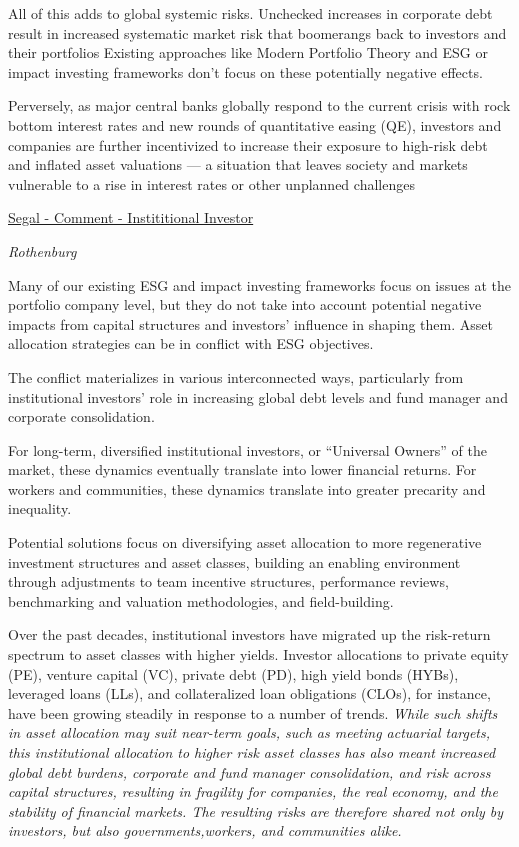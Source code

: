 \documentclass[
]{book}
\begin{document}
All of this adds to global systemic risks.
Unchecked increases in corporate debt result in increased systematic market risk that boomerangs back to investors and their portfolios
Existing approaches like Modern Portfolio Theory and ESG or impact investing frameworks don't focus on these potentially negative effects.

Perversely, as major central banks globally respond to the current crisis with rock bottom interest rates and new rounds of quantitative easing (QE), investors and companies are further incentivized to increase their exposure to high-risk debt and inflated asset valuations --- a situation that leaves society and markets vulnerable to a rise in interest rates or other unplanned challenges

\href{https://www.institutionalinvestor.com/article/b1r9js87jhyn8s/How-Institutional-Investors-Encourage-Corporations-Bad-Behavior}{Segal - Comment - Instititional Investor}

\emph{Rothenburg}

Many of our existing ESG and impact investing frameworks focus on issues at the
portfolio company level, but they do not take into account potential negative
impacts from capital structures and investors' influence in shaping them.
Asset allocation strategies can be in conflict with ESG objectives.

The conflict materializes in various interconnected ways, particularly from
institutional investors' role in increasing global debt levels and
fund manager and corporate consolidation.

For long-term, diversified institutional investors, or ``Universal Owners''
of the market, these dynamics eventually translate into lower financial returns.
For workers and communities, these dynamics translate into
greater precarity and inequality.

Potential solutions focus on diversifying asset allocation to
more regenerative investment structures and asset classes, building an
enabling environment through adjustments to team incentive structures, performance reviews,
benchmarking and valuation methodologies, and field-building.

Over the past decades, institutional investors have migrated up
the risk-return spectrum to asset classes with higher yields.
Investor allocations to private equity (PE), venture capital (VC), private debt (PD),
high yield bonds (HYBs), leveraged loans (LLs), and
collateralized loan obligations (CLOs), for instance,
have been growing steadily in response to a number of trends.
\emph{While such shifts in asset allocation may suit near-term goals,
such as meeting actuarial targets, this institutional allocation to higher risk asset
classes has also meant increased global debt burdens, corporate and
fund manager consolidation, and risk across capital structures,
resulting in fragility for companies, the real economy, and the stability of
financial markets.
The resulting risks are therefore shared not only by investors,
but also governments,workers, and communities alike.}
\end{document}
